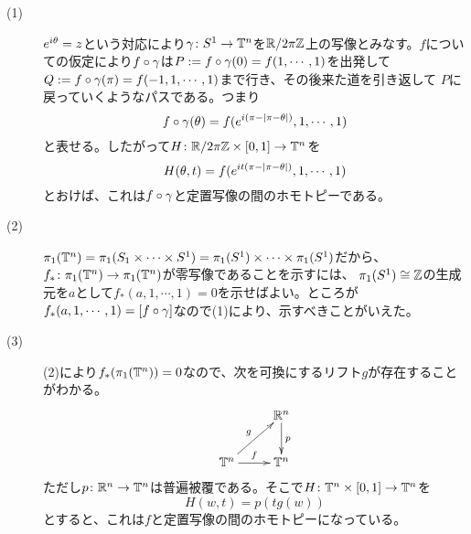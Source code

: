 \begin{sol} ${}$
\begin{description}
  \item[(1)] $e^{i {\theta}} = z$という対応により${\gamma} \colon S^1 \to {\mathbb T}^n$を${\mathbb R} / 2 \pi {\mathbb Z}$上の写像とみなす。$f$についての仮定により$f \circ {\gamma}$は$P := f \circ {\gamma}(0) = f(1, \cdots , 1)$を出発して$Q := f \circ {\gamma}(\pi) = f(-1, 1, \cdots , 1)$まで行き、その後来た道を引き返して
  $P$に戻っていくようなパスである。つまり
  \[
  f \circ {\gamma} ({\theta}) = f(e^{i(\pi - \left \lvert \pi - {\theta} \right \rvert)}, 1, \cdots , 1   )
  \]
  と表せる。したがって$H \colon {\mathbb R} / 2 \pi {\mathbb Z} \times [0,1] \to {\mathbb T}^n$を
  \[
  H({\theta}, t) = f(e^{it(\pi - \left \lvert \pi - {\theta} \right \rvert)}, 1, \cdots , 1 )
  \]
  とおけば、これは$f \circ {\gamma}$と定置写像の間のホモトピーである。
  \item[(2)] $\pi_1({\mathbb T}^n) = \pi_1(S_1 \times \cdots \times S^1) = \pi_1(S^1) \times \cdots \times \pi_1(S^1)$だから、$f_* \colon \pi_1({\mathbb T}^n) \to \pi_1({\mathbb T}^n)$が零写像であることを示すには、
  $\pi_1(S^1) \cong {\mathbb Z}$の生成元を$a$として$f_*(a,1, \cdots , 1) = 0$を示せばよい。ところが$f_*(a,1, \cdots , 1) =  [f \circ {\gamma}]$なので(1)により、示すべきことがいえた。
  \item[(3)] (2)により$f_* (\pi_1({\mathbb T}^n))=0$なので、次を可換にするリフト$g$が存在することがわかる。
  \[
  \xymatrix{
  {} & \R^n \ar[d]^p \\
  \T^n \ar[ru]^g \ar[r]^f & \T^n
  }
  \]
  ただし$p \colon {\mathbb R}^n \to {\mathbb T}^n$は普遍被覆である。そこで$H \colon {\mathbb T}^n \times [0,1] \to {\mathbb T}^n$を
  \[
  H(w,t) =  p( t g(w))
  \]
  とすると、これは$f$と定置写像の間のホモトピーになっている。
\end{description}
\end{sol}


\newpage


\subsubsection{}%
\begin{sol}

\end{sol}
